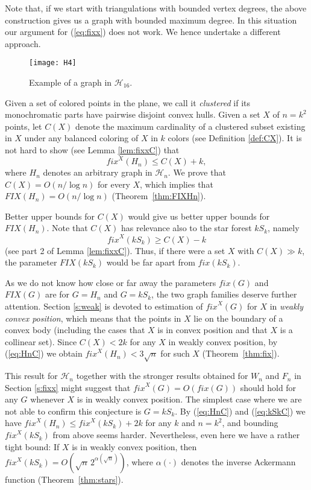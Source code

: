 \documentclass[reqno,12pt]{amsart}
\newcommand{\fix}[1]{\mathit{fix}(#1)}
\newcommand{\refeq}[1]{(\ref{eq:#1})}
\newcommand{\fixx}[1]{\mathit{fix}^X(#1)}
\newcommand{\FIX}[1]{\mathit{FIX}(#1)}
\newcommand{\calH}{{\mathcal H}}
\begin{document}
Note that, if we start with triangulations with bounded vertex degrees, 
the above construction gives us a graph with bounded maximum degree.
In this situation our argument for \refeq{fixx}
does not work. We hence undertake a different approach.

\begin{figure}
\centerline{\texttt{[image: H4]}}
\caption{Example of a graph in $\calH_{16}$.}
\label{fig:Gk4}
\end{figure}

Given a set of colored points in the plane, we
call it \emph{clustered} if its monochromatic parts have pairwise disjoint
convex hulls. Given a set $X$ of $n=k^2$ points, let $C(X)$ denote
the maximum cardinality of a clustered subset existing in $X$
under any balanced coloring of $X$ in $k$ colors (see Definition \ref{def:CX}).
It is not hard to show (see Lemma \ref{lem:fixxC}) that
\begin{equation}\label{eq:HnC}
\fixx{H_n}\le C(X)+k,
\end{equation}
where $H_n$ denotes an arbitrary graph in $\calH_n$.
We prove that $C(X)=O(n/\log n)$ for every $X$, which implies that $\FIX{H_n}=O(n/\log n)$ 
(Theorem~\ref{thm:FIXHn}).

Better upper bounds for $C(X)$ would give us better upper bounds for $\FIX{H_n}$.
Note that $C(X)$ has relevance also to the star forest ${kS_k}$, namely
\begin{equation}\label{eq:kSkC}
\fixx{kS_k}\ge C(X)-k
\end{equation}
(see part 2 of Lemma \ref{lem:fixxC}).
Thus, if there were a set $X$ with $C(X)\gg k$, the parameter $\FIX{kS_k}$
would be far apart from $\fix{kS_k}$.

As we do not know how close or far away the parameters $\fix G$ and $\FIX G$ are
for $G=H_n$ and $G=kS_k$, the two graph families deserve further attention.
Section \ref{s:weak} is devoted to estimation of $\fixx G$ for $X$ in
\emph{weakly convex position}, which means that the points in $X$
lie on the boundary of a convex body (including the cases that $X$
is in convex position and that $X$ is a collinear set). Since
$C(X)<2k$ for any $X$ in weakly convex position, by \refeq{HnC} we
obtain $\fixx{H_n}<3\sqrt n$ for such $X$ (Theorem~\ref{thm:fix}). 


This result for $\calH_n$ together with the stronger results obtained for
$W_n$ and $F_n$ in Section \ref{s:fixx} might suggest
that $\fixx G=O(\fix G)$ should hold for any $G$ whenever $X$ is in weakly convex position.
The simplest case where we are not able to confirm this conjecture is $G=kS_k$.
By \refeq{HnC} and \refeq{kSkC} we have $\fixx{H_n}\le\fixx{kS_k}+2k$ for any $k$ and $n=k^2$,
and bounding $\fixx{kS_k}$ from above seems harder.
Nevertheless, even here we have a rather tight bound: 
If $X$ is in weakly convex position, then
$\fixx{kS_k}=O(\sqrt n\,2^{\alpha(\sqrt{n})})$, where $\alpha(\cdot)$
denotes the inverse Ackermann function (Theorem~\ref{thm:stars}).
\end{document}
